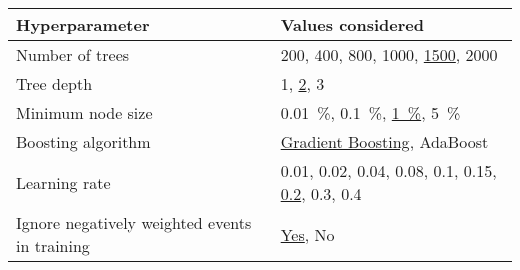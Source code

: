 \begin{tabular}{ll}
  \toprule
  Hyperparameter & Values considered \\
  \midrule
  Number of trees & 200, 400, 800, 1000, \underline{1500}, 2000 \\[0.1em]
  Tree depth & 1, \underline{2}, 3 \\[0.1em]
  Minimum node size & \SI{0.01}{\percent}, \SI{0.1}{\percent}, \underline{\SI{1}{\percent}}, \SI{5}{\percent} \\[0.1em]
  Boosting algorithm & \underline{Gradient Boosting}, AdaBoost \\[0.1em]
  Learning rate & 0.01, 0.02, 0.04, 0.08, 0.1, 0.15, \underline{0.2}, 0.3, 0.4 \\[0.1em]
  Ignore negatively weighted events in training & \underline{Yes}, No \\
  \bottomrule
\end{tabular}

